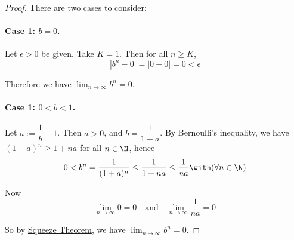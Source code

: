 \begin{proof}
  There are two cases to consider:

  \paragraph{Case 1: $b=0$.}

  Let $\epsilon>0$ be given. Take $K=1$. Then for all $n\geq K$,
  $$
    |b^n-0|=|0-0|=0<\epsilon
  $$

  Therefore we have $\displaystyle\lim_{n\to\infty}b^n=0$.

  \paragraph{Case 1: $0<b<1$.}

  Let $a:=\dfrac1b-1$. Then $a>0$, and $b=\dfrac1{1+a}$. By
  \href{d44713f}{Bernoulli's inequality}, we have $(1+a)^n\geq1+na$ for all
  $n\in\N$, hence
  $$
    0<b^n=\frac1{(1+a)^n}\leq\frac1{1+na}\leq\frac1{na}\with(\forall n\in\N)
  $$

  Now
  $$
    \lim_{n\to\infty}0=0\quad\text{and}\quad\lim_{n\to\infty}\frac1{na}=0
  $$

  So by \href{c3364d9}{Squeeze Theorem}, we have
  $\displaystyle\lim_{n\to\infty}b^n=0$.
\end{proof}
